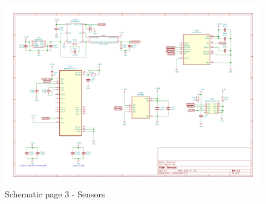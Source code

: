 \begin{landscape}
\begin{figure}[!htb]
\centering
\includegraphics[width=\paperwidth,keepaspectratio]{images/Schematic_Sensors.png}
\caption{Schematic page 3 - Sensors}
\label{fig:schematic_sensors}
\end{figure}

\end{landscape}
